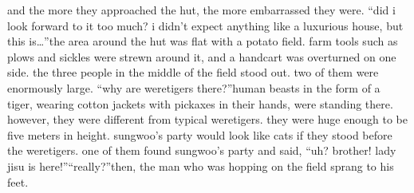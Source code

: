and the more they approached the hut, the more embarrassed they were.
“did i look forward to it too much? i didn’t expect anything like a luxurious house, but this is…”the area around the hut was flat with a potato field.
 farm tools such as plows and sickles were strewn around it, and a handcart was overturned on one side.
the three people in the middle of the field stood out.
 two of them were enormously large.
“why are weretigers there?”human beasts in the form of a tiger, wearing cotton jackets with pickaxes in their hands, were standing there.
 however, they were different from typical weretigers.
 they were huge enough to be five meters in height.
 sungwoo’s party would look like cats if they stood before the weretigers.
one of them found sungwoo’s party and said, “uh? brother! lady jisu is here!”“really?”then, the man who was hopping on the field sprang to his feet.

